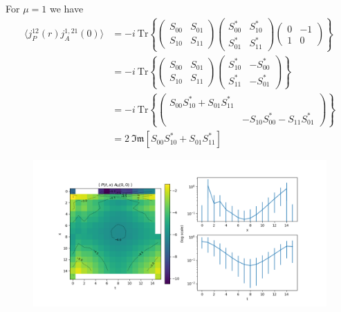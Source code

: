 \documentclass{article}
\newcommand{\Tr}[1]{\text{Tr}\left\{ #1 \right\}}
\renewcommand{\Im}[1]{\mathfrak{Im}\left[ #1 \right]}
\begin{document}
For $\mu = 1$ we have
\begin{align*}
    \langle j_P^{12} (r) j_A^{1, 21}(0) \rangle
    &= -i \ \Tr{ \begin{pmatrix} S_{00} & S_{01} \\ S_{10} & S_{11} \end{pmatrix}  \begin{pmatrix} S_{00}^* & S_{10}^* \\ S_{01}^* & S_{11}^* \end{pmatrix} \begin{pmatrix} 0 & -1 \\ 1 & 0 \end{pmatrix} } \\
    &= -i \ \Tr{ \begin{pmatrix} S_{00} & S_{01} \\ S_{10} & S_{11} \end{pmatrix} \begin{pmatrix} S_{10}^* & -S_{00}^* \\ S_{11}^* & -S_{01}^* \end{pmatrix}} \\
    &= -i \ \Tr{\begin{pmatrix} S_{00} S_{10}^* + S_{01} S_{11}^* &  \\ & -S_{10} S_{00}^* - S_{11} S_{01}^* \end{pmatrix}} \\
    &= 2 \ \Im{S_{00} S_{10}^* + S_{01} S_{11}^*}
\end{align*}

\begin{figure}[H]
    \centering
    \includegraphics[width=\textwidth]{../plots/PA0.png}
    \caption{}
    \label{}
\end{figure}
\end{document}
